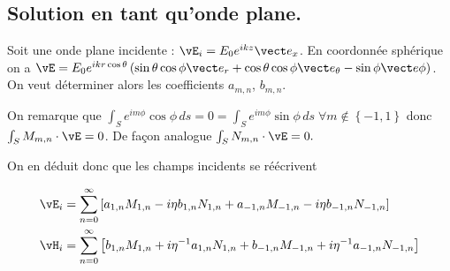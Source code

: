 \subsection{Solution en tant qu'onde plane.}

Soit une onde plane incidente : \(\vE_i = E_0 e^{ikz}\vect e_x\). En coordonnée sphérique on a \(\vE = E_0e^{ikr\cos\theta}\left(\sin\theta\cos\phi\vect e_r + \cos\theta\cos\phi\vect e_\theta - \sin\phi \vect e \phi\right)\). On veut déterminer alors les coefficients \(a_{m,n}\), \(b_{m,n}\).

On remarque que \(\int_S e^{im\phi} \cos\phi \, ds = 0 = \int_S e^{im\phi} \sin\phi \,ds\; \forall m \not \in \left\lbrace -1,1 \right\rbrace\) donc \(\int_S M_{m,n} \cdot \vE = 0\). De façon analogue \(\int_S N_{m,n} \cdot \vE = 0.\)

On en déduit donc que les champs incidents se réécrivent

\begin{align*}
    \vE_i &= \sum\limits_{n=0}^\infty\left[
    a_{1,n}  M_{1,n} - i \eta b_{1,n} N_{1,n}
    + a_{-1,n}  M_{-1,n} - i \eta b_{-1,n} N_{-1,n}
    \right]\\
    \vH_i &= \sum\limits_{n=0}^\infty\left[
    b_{1,n}  M_{1,n} + i {\eta}^{-1} a_{1,n} N_{1,n}
    + b_{-1,n}  M_{-1,n} + i {\eta}^{-1} a_{-1,n} N_{-1,n}
    \right]
\end{align*}






